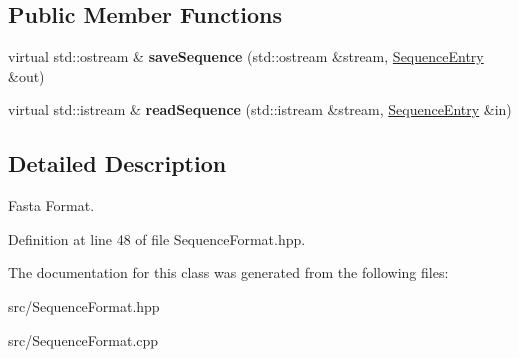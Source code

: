 \subsection*{Public Member Functions}
\begin{DoxyCompactItemize}
\item 
\mbox{\label{classtops_1_1FastaSequenceFormat_ad7a12724117c9e1ab9b40ec62a4c9081}} 
virtual std\+::ostream \& {\bfseries save\+Sequence} (std\+::ostream \&stream, \hyperlink{classtops_1_1SequenceEntry}{Sequence\+Entry} \&out)
\item 
\mbox{\label{classtops_1_1FastaSequenceFormat_af4d170c67e5df18452968f591b39e1e0}} 
virtual std\+::istream \& {\bfseries read\+Sequence} (std\+::istream \&stream, \hyperlink{classtops_1_1SequenceEntry}{Sequence\+Entry} \&in)
\end{DoxyCompactItemize}


\subsection{Detailed Description}
Fasta Format. 

Definition at line 48 of file Sequence\+Format.\+hpp.



The documentation for this class was generated from the following files\+:\begin{DoxyCompactItemize}
\item 
src/Sequence\+Format.\+hpp\item 
src/Sequence\+Format.\+cpp\end{DoxyCompactItemize}

